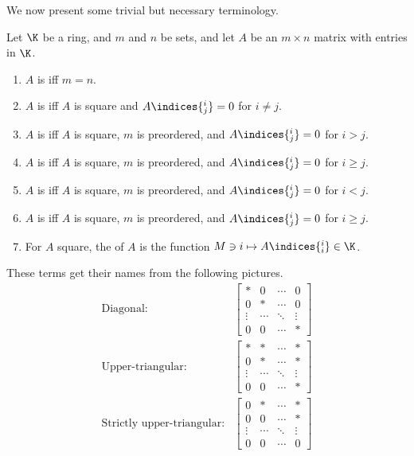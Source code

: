 We now present some trivial but necessary terminology.
\begin{dfn}{}{}
	Let $\K$ be a ring, and $m$ and $n$ be sets, and let $A$ be an $m\times n$ matrix with entries in $\K$.
	\begin{enumerate}
		\item $A$ is  iff $m=n$.
		\item $A$ is  iff $A$ is square and $A\indices{^i_j}=0$ for $i\neq j$.
		\item $A$ is  iff $A$ is square, $m$ is preordered, and $A\indices{^i_j}=0$ for $i>j$.
		\item $A$ is  iff $A$ is square, $m$ is preordered, and $A\indices{^i_j}=0$ for $i\geq j$.
		\item $A$ is  iff $A$ is square, $m$ is preordered, and $A\indices{^i_j}=0$ for $i<j$.
		\item $A$ is  iff $A$ is square, $m$ is preordered, and $A\indices{^i_j}=0$ for $i\geq j$.
		\item For $A$ square, the  of $A$ is the function $M\ni i\mapsto A\indices{^i_i}\in \K$.
	\end{enumerate}
	\begin{rmk}
		These terms get their names from the following pictures.
		\begin{subequations}
			\begin{align}
			\text{Diagonal:} & \begin{bmatrix}* & 0 & \cdots & 0 \\ 0 & * & \cdots & 0 \\ \vdots & \cdots & \ddots & \vdots \\ 0 & 0 & \cdots & *\end{bmatrix} \\
			\text{Upper-triangular:} & \begin{bmatrix}* & * & \cdots & * \\ 0 & * & \cdots & * \\ \vdots & \cdots & \ddots & \vdots \\ 0 & 0 & \cdots & *\end{bmatrix} \\
			\text{Strictly upper-triangular:} & \begin{bmatrix}0 & * & \cdots & * \\ 0 & 0 & \cdots & * \\ \vdots & \cdots & \ddots & \vdots \\ 0 & 0 & \cdots & 0\end{bmatrix} \\

\end{align}
\end{subequations}
\end{rmk}
\end{dfn}

